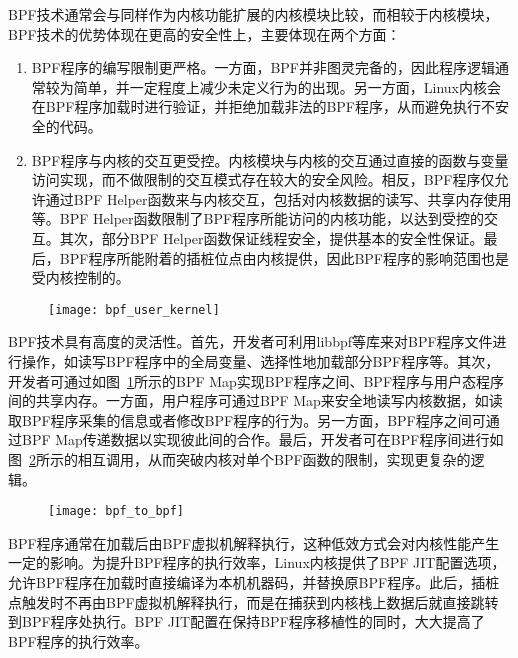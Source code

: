 BPF技术通常会与同样作为内核功能扩展的内核模块比较，而相较于内核模块，BPF技术的优势体现在更高的安全性上，主要体现在两个方面：

\begin{enumerate}
    \item BPF程序的编写限制更严格。一方面，BPF并非图灵完备的，因此程序逻辑通常较为简单，并一定程度上减少未定义行为的出现。另一方面，Linux内核会在BPF程序加载时进行验证，并拒绝加载非法的BPF程序，从而避免执行不安全的代码。
    \item BPF程序与内核的交互更受控。内核模块与内核的交互通过直接的函数与变量访问实现，而不做限制的交互模式存在较大的安全风险。相反，BPF程序仅允许通过BPF Helper函数来与内核交互，包括对内核数据的读写、共享内存使用等。BPF Helper函数限制了BPF程序所能访问的内核功能，以达到受控的交互。其次，部分BPF Helper函数保证线程安全，提供基本的安全性保证。最后，BPF程序所能附着的插桩位点由内核提供，因此BPF程序的影响范围也是受内核控制的。
\end{enumerate}

\begin{figure}[!htbp]
    \centering
    \texttt{[image: bpf\_user\_kernel]}
    \label{fig:bpf_user_kernel}
\end{figure}

BPF技术具有高度的灵活性。首先，开发者可利用libbpf等库来对BPF程序文件进行操作，如读写BPF程序中的全局变量、选择性地加载部分BPF程序等。其次，开发者可通过如图~\ref{fig:bpf_user_kernel}所示的BPF Map实现BPF程序之间、BPF程序与用户态程序间的共享内存。一方面，用户程序可通过BPF Map来安全地读写内核数据，如读取BPF程序采集的信息或者修改BPF程序的行为。另一方面，BPF程序之间可通过BPF Map传递数据以实现彼此间的合作。最后，开发者可在BPF程序间进行如图~\ref{fig:bpf_to_bpf}所示的相互调用，从而突破内核对单个BPF函数的限制，实现更复杂的逻辑。

\begin{figure}[!htbp]
    \centering
    \texttt{[image: bpf\_to\_bpf]}
    \label{fig:bpf_to_bpf}
\end{figure}

BPF程序通常在加载后由BPF虚拟机解释执行，这种低效方式会对内核性能产生一定的影响。为提升BPF程序的执行效率，Linux内核提供了BPF JIT配置选项，允许BPF程序在加载时直接编译为本机机器码，并替换原BPF程序。此后，插桩点触发时不再由BPF虚拟机解释执行，而是在捕获到内核栈上数据后就直接跳转到BPF程序处执行。BPF JIT配置在保持BPF程序移植性的同时，大大提高了BPF程序的执行效率。

